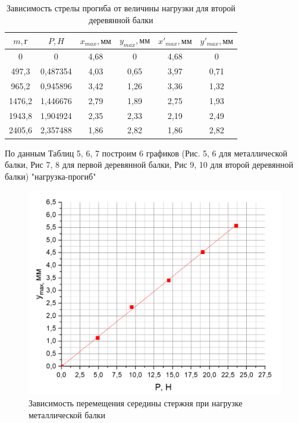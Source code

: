 \documentclass[a4paper,12pt]{article} %
\begin{document}
\newpage
\begin{table}[h]
\centering
\begin{tabular}{|c|c|c|c|c|c|}
\hline
$m, \text{г}$   & $P,  H$    & $x_{max}, \text{мм}$ &  $y_{max}, \text{мм}$    & $x'_{max}, \text{мм}$ &    $y'_{max}, \text{мм}$  \\ \hline
0      & 0        & 4,68 & 0    & 4,68 & 0    \\ \hline
497,3  & 0,487354  & 4,03 & 0,65 & 3,97 & 0,71 \\ \hline
965,2  & 0,945896  & 3,42 & 1,26 & 3,36 & 1,32 \\ \hline
1476,2 & 1,446676 & 2,79 & 1,89 & 2,75 & 1,93 \\ \hline
1943,8 & 1,904924 & 2,35 & 2,33 & 2,19 & 2,49 \\ \hline
2405,6 & 2,357488 & 1,86 & 2,82 & 1,86 & 2,82 \\ \hline
\end{tabular}
\caption{Зависимость стрелы прогиба от величины нагрузки для второй деревянной балки}
\end{table}

По данным Таблиц 5, 6, 7 построим 6 графиков (Рис. 5, 6 для металлической балки, Рис 7, 8 для первой деревянной балки, Рис 9, 10 для второй деревянной балки)  "нагрузка-прогиб"
\begin{figure}[!h]
\centering
\includegraphics[scale=0.32]{6}
\caption{Зависимость перемещения середины стержня при нагрузке металлической балки}
\end{figure}
\end{document}
